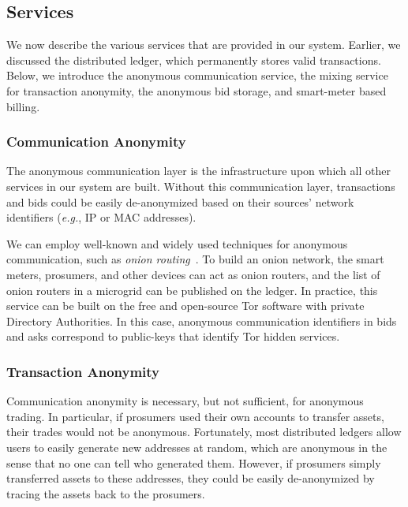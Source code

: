 \subsection{Services}

We now describe the various services that are provided in our system.
Earlier, we discussed the distributed ledger, which permanently stores
valid transactions.  Below, we introduce the anonymous communication
service, the mixing service for transaction anonymity, the anonymous
bid storage, and smart-meter based billing.

\subsubsection{Communication Anonymity}
The anonymous communication layer is the infrastructure upon which all
other services in our system are built.  Without this communication
layer, transactions and bids could be easily de-anonymized based on
their sources' network identifiers (\emph{e.g.}, IP or MAC addresses).

We can employ well-known and widely used techniques for anonymous
communication, such as \emph{onion routing}~\cite{reed1998anonymous}.
To build an onion network, the smart meters, prosumers, and other
devices can act as onion routers, and the list of onion routers in a
microgrid can be published on the ledger.  In practice, this service 
can be built on 
the free and open-source Tor software with private Directory
Authorities.  In this case, anonymous communication identifiers in
bids and asks correspond to public-keys that identify Tor hidden
services.

\subsubsection{Transaction Anonymity}
Communication anonymity is necessary, but not sufficient, for
anonymous trading. In particular, if prosumers used their own accounts
to transfer assets, their trades would not be anonymous.  Fortunately,
most distributed ledgers allow users to easily generate new addresses
at random, which are anonymous in the sense that no one can tell who
generated them.  However, if prosumers simply transferred assets to these
addresses, they could be easily de-anonymized by tracing the
assets back to the prosumers.

